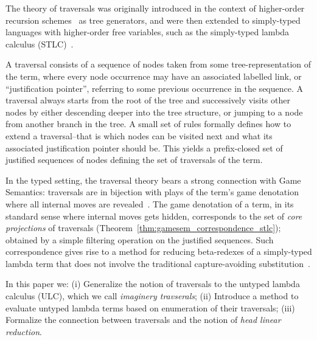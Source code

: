 \documentclass{elsarticle}
\theoremstyle{plain}
\theoremstyle{definition}
\theoremstyle{remark}
\begin{document}
The theory of traversals was originally introduced in the context of higher-order recursion schemes~\cite{Ong2006} as tree generators, and were
then extended to simply-typed languages with higher-order free variables, such as the simply-typed lambda calculus (STLC)~\cite{BlumPhd}.

A traversal consists of a sequence of nodes taken from some tree-representation of the term, where every node occurrence may have an associated labelled link, or ``justification pointer'', referring to some previous occurrence in the sequence. A traversal always starts from the root of the tree and successively visits other nodes by either descending deeper into the tree structure, or  jumping to a node from another branch in the tree. A small set of rules formally defines how to extend a traversal--that is which nodes can be visited next and what its associated justification pointer should be. This yields a prefix-closed set of justified sequences of nodes defining the set of traversals of the term.

In the typed setting, the traversal theory bears a strong connection with Game Semantics: traversals are in bijection with plays of the term's game denotation where all internal moves are revealed~\cite{BlumPhd}.
The game denotation of a term, in its standard sense where internal moves gets hidden, corresponds to the set of \emph{core projections} of traversals
(Theorem~\ref{thm:gamesem_correspondence_stlc}); obtained by a simple filtering operation on the justified sequences. Such correspondence gives rise to a method for reducing beta-redexes of a simply-typed lambda term that does not involve the traditional capture-avoiding substitution~\cite{danos-head,BlumPhd,BlumGalop2008,Blum-LocalBeta2008}.

In this paper we: (i) Generalize the notion of traversals to the untyped lambda calculus (ULC), which we call \emph{imaginery travserals}; (ii) Introduce a method to evaluate untyped lambda terms based on enumeration of their traversals; (iii) Formalize the connection between traversals and the notion of \emph{head linear reduction}.
\end{document}
